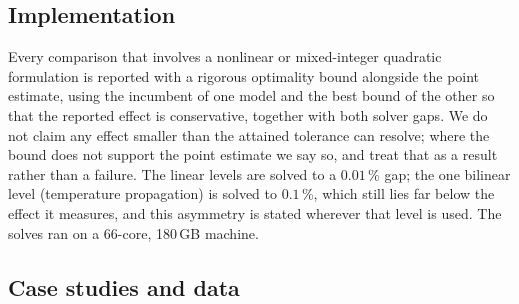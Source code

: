 \documentclass[a4paper,fleqn]{cas-dc}
\begin{document}
\subsection{Implementation}

Every comparison that involves a nonlinear or mixed-integer quadratic formulation is reported
with a rigorous optimality bound alongside the point estimate, using the incumbent of one model
and the best bound of the other so that the reported effect is conservative, together with both
solver gaps. We do not claim any effect smaller than the attained tolerance can resolve; where
the bound does not support the point estimate we say so, and treat that as a result rather than
a failure. The linear levels are solved to a $0.01$\,\% gap; the one bilinear level
(temperature propagation) is solved to $0.1$\,\%, which still lies far below the effect it
measures, and this asymmetry is stated wherever that level is used. The solves ran on a
66-core, 180\,GB machine.

\subsection{Case studies and data}
\label{sec:cases}
\end{document}
